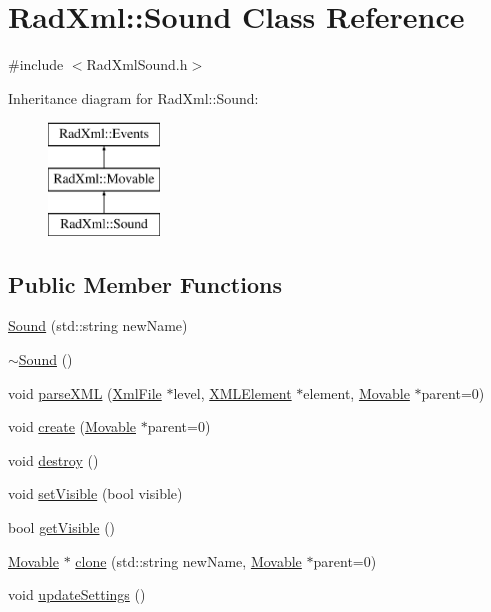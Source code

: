 \hypertarget{class_rad_xml_1_1_sound}{\section{Rad\-Xml\-:\-:Sound Class Reference}
\label{class_rad_xml_1_1_sound}
}


{\ttfamily \#include $<$Rad\-Xml\-Sound.\-h$>$}

Inheritance diagram for Rad\-Xml\-:\-:Sound\-:\begin{figure}[H]
\begin{center}
\leavevmode
\includegraphics[height=3.000000cm]{class_rad_xml_1_1_sound}
\end{center}
\end{figure}
\subsection*{Public Member Functions}
\begin{DoxyCompactItemize}
\item 
\hyperlink{class_rad_xml_1_1_sound_abcadbfd5600e23975940ce2b8cf14af0}{Sound} (std\-::string new\-Name)
\item 
\hyperlink{class_rad_xml_1_1_sound_ab356928e04a0b0cd0169196cd9ac6dcf}{$\sim$\-Sound} ()
\item 
void \hyperlink{class_rad_xml_1_1_sound_a0ba611df675d341f4e13288318faddf8}{parse\-X\-M\-L} (\hyperlink{class_rad_xml_1_1_xml_file}{Xml\-File} $\ast$level, \hyperlink{class_x_m_l_element}{X\-M\-L\-Element} $\ast$element, \hyperlink{class_rad_xml_1_1_movable}{Movable} $\ast$parent=0)
\item 
void \hyperlink{class_rad_xml_1_1_sound_af2aafa7355659a0c802bb509d799aa69}{create} (\hyperlink{class_rad_xml_1_1_movable}{Movable} $\ast$parent=0)
\item 
void \hyperlink{class_rad_xml_1_1_sound_a6844c037d516c474215d4676a6d88330}{destroy} ()
\item 
void \hyperlink{class_rad_xml_1_1_sound_a33e46132e40dbae813e2aff8290d5610}{set\-Visible} (bool visible)
\item 
bool \hyperlink{class_rad_xml_1_1_sound_a5f20320c423a348182c460c83087665d}{get\-Visible} ()
\item 
\hyperlink{class_rad_xml_1_1_movable}{Movable} $\ast$ \hyperlink{class_rad_xml_1_1_sound_a30d322cbd418e9ebabbbb83825e272fb}{clone} (std\-::string new\-Name, \hyperlink{class_rad_xml_1_1_movable}{Movable} $\ast$parent=0)
\item 
void \hyperlink{class_rad_xml_1_1_sound_ae1d86fe056c7b3810dac7b7b88b14923}{update\-Settings} ()
\end{DoxyCompactItemize}
